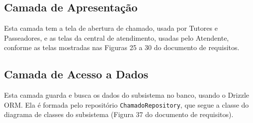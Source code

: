 \subsection{Camada de Apresentação}
\label{sec-componentes-suporte-apresentacao}

Esta camada tem a tela de abertura de chamado, usada por Tutores e Passeadores, e as telas da central de atendimento, usadas pelo Atendente, conforme as telas mostradas nas Figuras 25 a 30 do documento de requisitos.


\subsection{Camada de Acesso a Dados}
\label{sec-componentes-suporte-dados}

Esta camada guarda e busca os dados do subsistema no banco, usando o Drizzle ORM. Ela é formada pelo repositório \texttt{ChamadoRepository}, que segue a classe do diagrama de classes do subsistema (Figura 37 do documento de requisitos).